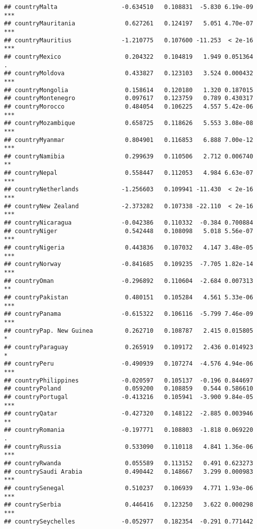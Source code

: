 \documentclass[
  11pt,
]{article}
\begin{document}
\begin{verbatim}
## countryMalta                  -0.634510   0.108831  -5.830 6.19e-09 ***
## countryMauritania              0.627261   0.124197   5.051 4.70e-07 ***
## countryMauritius              -1.210775   0.107600 -11.253  < 2e-16 ***
## countryMexico                  0.204322   0.104819   1.949 0.051364 .  
## countryMoldova                 0.433827   0.123103   3.524 0.000432 ***
## countryMongolia                0.158614   0.120180   1.320 0.187015    
## countryMontenegro              0.097617   0.123759   0.789 0.430317    
## countryMorocco                 0.484054   0.106225   4.557 5.42e-06 ***
## countryMozambique              0.658725   0.118626   5.553 3.08e-08 ***
## countryMyanmar                 0.804901   0.116853   6.888 7.00e-12 ***
## countryNamibia                 0.299639   0.110506   2.712 0.006740 ** 
## countryNepal                   0.558447   0.112053   4.984 6.63e-07 ***
## countryNetherlands            -1.256603   0.109941 -11.430  < 2e-16 ***
## countryNew Zealand            -2.373282   0.107338 -22.110  < 2e-16 ***
## countryNicaragua              -0.042386   0.110332  -0.384 0.700884    
## countryNiger                   0.542448   0.108098   5.018 5.56e-07 ***
## countryNigeria                 0.443836   0.107032   4.147 3.48e-05 ***
## countryNorway                 -0.841685   0.109235  -7.705 1.82e-14 ***
## countryOman                   -0.296892   0.110604  -2.684 0.007313 ** 
## countryPakistan                0.480151   0.105284   4.561 5.33e-06 ***
## countryPanama                 -0.615322   0.106116  -5.799 7.46e-09 ***
## countryPap. New Guinea         0.262710   0.108787   2.415 0.015805 *  
## countryParaguay                0.265919   0.109172   2.436 0.014923 *  
## countryPeru                   -0.490939   0.107274  -4.576 4.94e-06 ***
## countryPhilippines            -0.020597   0.105137  -0.196 0.844697    
## countryPoland                  0.059200   0.108859   0.544 0.586610    
## countryPortugal               -0.413216   0.105941  -3.900 9.84e-05 ***
## countryQatar                  -0.427320   0.148122  -2.885 0.003946 ** 
## countryRomania                -0.197771   0.108803  -1.818 0.069220 .  
## countryRussia                  0.533090   0.110118   4.841 1.36e-06 ***
## countryRwanda                  0.055589   0.113152   0.491 0.623273    
## countrySaudi Arabia            0.490442   0.148667   3.299 0.000983 ***
## countrySenegal                 0.510237   0.106939   4.771 1.93e-06 ***
## countrySerbia                  0.446416   0.123250   3.622 0.000298 ***
## countrySeychelles             -0.052977   0.182354  -0.291 0.771442    

\end{verbatim}
\end{document}
